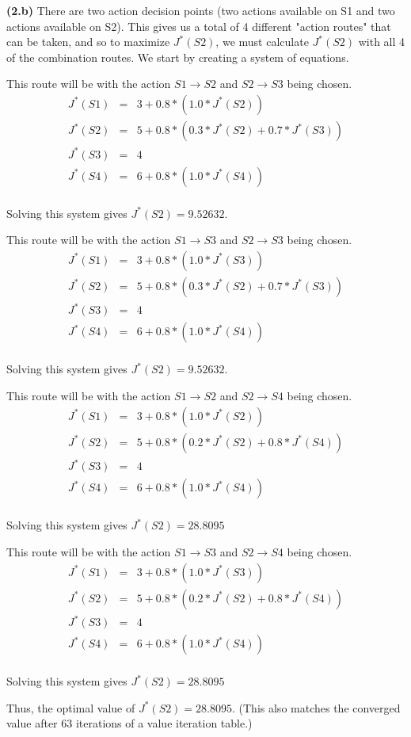 \documentclass[11pt]{article}
\renewcommand{\part}[1] {\vspace{.10in} {\bf (#1)}}
\begin{document}
\part{2.b}
There are two action decision points (two actions available on S1 and two actions available on S2). This gives us a total of 4 different "action routes" that can be taken, and so to maximize $J^*(S2)$, we must calculate $J^*(S2)$ with all 4 of the combination routes. We start by creating a system of equations.

This route will be with the action $S1 \rightarrow S2$ and $S2 \rightarrow S3$ being chosen.
\begin{eqnarray*}
J^*(S1) &=& 3 + 0.8*(1.0 * J^*(S2))\\
J^*(S2) &=& 5 + 0.8*(0.3*J^*(S2) + 0.7*J^*(S3))\\
J^*(S3) &=& 4\\
J^*(S4) &=& 6 + 0.8*(1.0 * J^*(S4))\\
\end{eqnarray*}

Solving this system gives $J^*(S2) = 9.52632$.

This route will be with the action $S1 \rightarrow S3$ and $S2 \rightarrow S3$ being chosen.
\begin{eqnarray*}
J^*(S1) &=& 3 + 0.8*(1.0 * J^*(S3))\\
J^*(S2) &=& 5 + 0.8*(0.3*J^*(S2) + 0.7*J^*(S3))\\
J^*(S3) &=& 4\\
J^*(S4) &=& 6 + 0.8*(1.0 * J^*(S4))\\
\end{eqnarray*}

Solving this system gives $J^*(S2) = 9.52632$.

This route will be with the action $S1 \rightarrow S2$ and $S2 \rightarrow S4$ being chosen.
\begin{eqnarray*}
J^*(S1) &=& 3 + 0.8*(1.0 * J^*(S2))\\
J^*(S2) &=& 5 + 0.8*(0.2*J^*(S2) + 0.8*J^*(S4))\\
J^*(S3) &=& 4\\
J^*(S4) &=& 6 + 0.8*(1.0 * J^*(S4))\\
\end{eqnarray*}

Solving this system gives $J^*(S2) = 28.8095$

This route will be with the action $S1 \rightarrow S3$ and $S2 \rightarrow S4$ being chosen.
\begin{eqnarray*}
J^*(S1) &=& 3 + 0.8*(1.0 * J^*(S3))\\
J^*(S2) &=& 5 + 0.8*(0.2*J^*(S2) + 0.8*J^*(S4))\\
J^*(S3) &=& 4\\
J^*(S4) &=& 6 + 0.8*(1.0 * J^*(S4))\\
\end{eqnarray*}

Solving this system gives $J^*(S2) = 28.8095$


Thus, the optimal value of $J^*(S2) = 28.8095$. (This also matches the converged value after 63 iterations of a value iteration table.)
\end{document}
